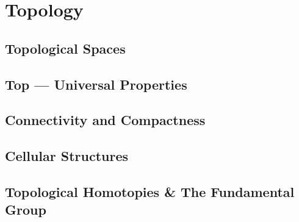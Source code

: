 




% 
% 
% 
% 
% 

\part{Topology}

\chapter{Topological Spaces}









\chapter{\textbf{Top} --- Universal Properties}





\chapter{Connectivity and Compactness}



\chapter{Cellular Structures}



\chapter{Topological Homotopies \& The Fundamental Group}


